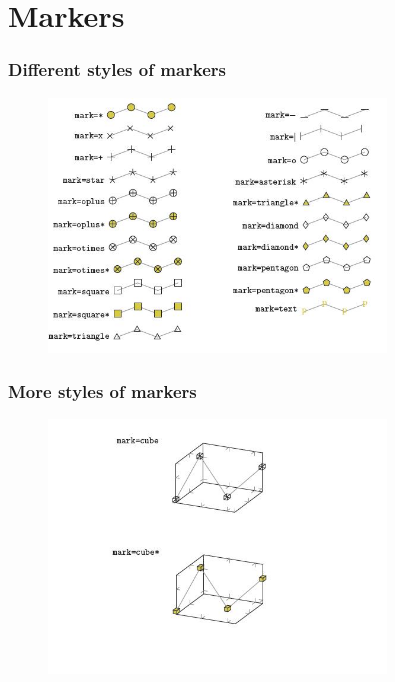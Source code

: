 \documentclass{beamer}
\begin{document}
\section{Markers}
\begin{frame}[fragile]
\frametitle{Different styles of markers}
\begin{figure}
\centering
\includegraphics[width=0.8\textwidth]{fig1.jpg}
\end{figure}
\end{frame}
\begin{frame}[fragile]
\frametitle{More styles of markers}
\begin{figure}
\centering
\includegraphics[width=0.8\textwidth]{fig2.jpg}
\end{figure}
\end{frame}
\end{document}
